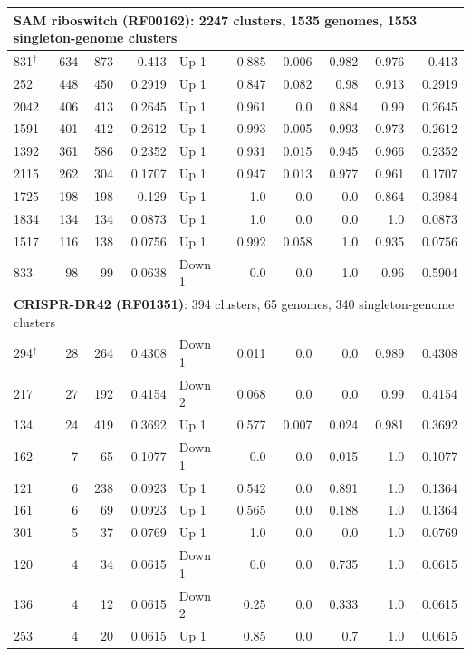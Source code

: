 \begin{longtable}{lrrrlrrrrr}
\multicolumn{10}{l}{\textbf{SAM riboswitch (RF00162)}: 2247 clusters, 1535 genomes, 1553 singleton-genome clusters} \\
\hline
831$^\dagger$ & 634 & 873 & 0.413 & Up 1 & 0.885 & 0.006 & 0.982 & 0.976 & 0.413\\
252 & 448 & 450 & 0.2919 & Up 1 & 0.847 & 0.082 & 0.98 & 0.913 & 0.2919 \\
2042 & 406 & 413 & 0.2645 & Up 1 & 0.961 & 0.0 & 0.884 & 0.99 & 0.2645 \\
1591 & 401 & 412 & 0.2612 & Up 1 & 0.993 & 0.005 & 0.993 & 0.973 & 0.2612 \\
1392 & 361 & 586 & 0.2352 & Up 1 & 0.931 & 0.015 & 0.945 & 0.966 & 0.2352 \\
2115 & 262 & 304 & 0.1707 & Up 1 & 0.947 & 0.013 & 0.977 & 0.961 & 0.1707 \\
1725 & 198 & 198 & 0.129 & Up 1 & 1.0 & 0.0 & 0.0 & 0.864 & 0.3984 \\
1834 & 134 & 134 & 0.0873 & Up 1 & 1.0 & 0.0 & 0.0 & 1.0 & 0.0873 \\
1517 & 116 & 138 & 0.0756 & Up 1 & 0.992 & 0.058 & 1.0 & 0.935 & 0.0756 \\
833 & 98 & 99 & 0.0638 & Down 1 & 0.0 & 0.0 & 1.0 & 0.96 & 0.5904 \\
\hline

\multicolumn{10}{l}{\textbf{CRISPR-DR42 (RF01351)}: 394 clusters, 65 genomes, 340 singleton-genome clusters} \\
\hline
294$^\dagger$ & 28 & 264 & 0.4308 & Down 1 & 0.011 & 0.0 & 0.0 & 0.989 & 0.4308 \\
217 & 27 & 192 & 0.4154 & Down 2 & 0.068 & 0.0 & 0.0 & 0.99 & 0.4154 \\
134 & 24 & 419 & 0.3692 & Up 1 & 0.577 & 0.007 & 0.024 & 0.981 & 0.3692 \\
162 & 7 & 65 & 0.1077 & Down 1 & 0.0 & 0.0 & 0.015 & 1.0 & 0.1077 \\
121 & 6 & 238 & 0.0923 & Up 1 & 0.542 & 0.0 & 0.891 & 1.0 & 0.1364 \\
161 & 6 & 69 & 0.0923 & Up 1 & 0.565 & 0.0 & 0.188 & 1.0 & 0.1364 \\
301 & 5 & 37 & 0.0769 & Up 1 & 1.0 & 0.0 & 0.0 & 1.0 & 0.0769 \\
120 & 4 & 34 & 0.0615 & Down 1 & 0.0 & 0.0 & 0.735 & 1.0 & 0.0615 \\
136 & 4 & 12 & 0.0615 & Down 2 & 0.25 & 0.0 & 0.333 & 1.0 & 0.0615 \\
253 & 4 & 20 & 0.0615 & Up 1 & 0.85 & 0.0 & 0.7 & 1.0 & 0.0615 \\
\hline


\end{longtable}
